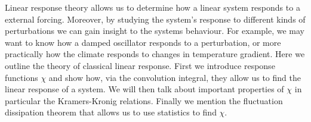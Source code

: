 
Linear response theory allows us to determine how a linear system responds to a external forcing. Moreover, by studying the system's response to different kinds of perturbations we can gain insight to the systems behaviour. For example, we may want to know how a damped oscillator responds to a perturbation, or more practically how the climate responds to changes in temperature gradient. Here we outline the theory of classical linear response. First we introduce response functions $\chi$ and show how, via the convolution integral, they allow us to find the linear response of a system. We will then talk about important properties of $\chi$ in particular the Kramers-Kronig relations. Finally we mention the fluctuation dissipation theorem that allows us to use statistics to find $\chi$.